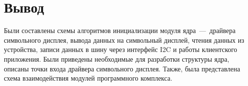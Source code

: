 \section*{Вывод}
Были составлены схемы алгоритмов инициализации модуля ядра~---~драйвера символьного дисплея, вывода данных на символьный дисплей, чтения данных из устройства, записи данных в шину через интерфейс I2C и работы клиентского приложения. Были приведены необходимые для разработки структуры ядра, описаны точки входа драйвера символьного дисплея. Также, была представлена схема взаимодействия модулей программного комплекса.



